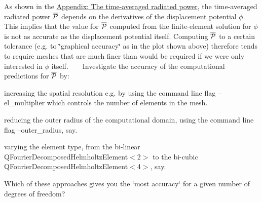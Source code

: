 \begin{DoxyItemize}
\item As shown in the \hyperlink{index_appendix}{Appendix\+: The time-\/averaged radiated power}, the time-\/averaged radiated power $ \overline{\cal P}$ depends on the derivatives of the displacement potential $ \phi $. This implies that the value for $ \overline{\cal P}$ computed from the finite-\/element solution for $ \phi $ is not as accurate as the displacement potential itself. Computing $ \overline{\cal P}$ to a certain tolerance (e.\+g. to \char`\"{}graphical accuracy\char`\"{} as in the plot shown above) therefore tends to require meshes that are much finer than would be required if we were only interested in $ \phi $ itself. ~\newline
~\newline
 Investigate the accuracy of the computational predictions for $ \overline{\cal P}$ by\+:
\begin{DoxyItemize}
\item increasing the spatial resolution e.\+g. by using the command line flag {\ttfamily --el\+\_\+multiplier} which controls the number of elements in the mesh.
\item reducing the outer radius of the computational domain, using the command line flag {\ttfamily --outer\+\_\+radius}, say.
\item varying the element type, from the bi-\/linear {\ttfamily Q\+Fourier\+Decomposed\+Helmholtz\+Element$<$2$>$} to the bi-\/cubic {\ttfamily Q\+Fourier\+Decomposed\+Helmholtz\+Element$<$4$>$}, say.
\end{DoxyItemize}Which of these approaches gives you the \char`\"{}most accuracy\char`\"{} for a given number of degrees of freedom?
\end{DoxyItemize}

 


